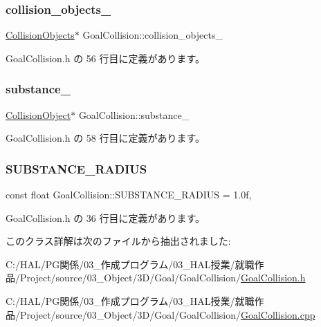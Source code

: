\subsubsection{\texorpdfstring{collision\+\_\+objects\+\_\+}{collision\_objects\_}}
{\footnotesize\ttfamily \mbox{\hyperlink{class_collision_objects}{Collision\+Objects}}$\ast$ Goal\+Collision\+::collision\+\_\+objects\+\_\+\hspace{0.3cm}{\ttfamily [private]}}



 Goal\+Collision.\+h の 56 行目に定義があります。

\mbox{\label{class_goal_collision_a8fa4a9b7ed96d453d4615641073937bb}} 
\subsubsection{\texorpdfstring{substance\+\_\+}{substance\_}}
{\footnotesize\ttfamily \mbox{\hyperlink{class_collision_object}{Collision\+Object}}$\ast$ Goal\+Collision\+::substance\+\_\+\hspace{0.3cm}{\ttfamily [private]}}



 Goal\+Collision.\+h の 58 行目に定義があります。

\mbox{\label{class_goal_collision_a6eb0dff2f8f77b38067eee8b22cce08a}} 
\subsubsection{\texorpdfstring{S\+U\+B\+S\+T\+A\+N\+C\+E\+\_\+\+R\+A\+D\+I\+US}{SUBSTANCE\_RADIUS}}
{\footnotesize\ttfamily const float Goal\+Collision\+::\+S\+U\+B\+S\+T\+A\+N\+C\+E\+\_\+\+R\+A\+D\+I\+US = 1.\+0f\hspace{0.3cm}{\ttfamily [static]}, {\ttfamily [private]}}



 Goal\+Collision.\+h の 36 行目に定義があります。



このクラス詳解は次のファイルから抽出されました\+:\begin{DoxyCompactItemize}
\item 
C\+:/\+H\+A\+L/\+P\+G関係/03\+\_\+作成プログラム/03\+\_\+\+H\+A\+L授業/就職作品/\+Project/source/03\+\_\+\+Object/3\+D/\+Goal/\+Goal\+Collision/\mbox{\hyperlink{_goal_collision_8h}{Goal\+Collision.\+h}}\item 
C\+:/\+H\+A\+L/\+P\+G関係/03\+\_\+作成プログラム/03\+\_\+\+H\+A\+L授業/就職作品/\+Project/source/03\+\_\+\+Object/3\+D/\+Goal/\+Goal\+Collision/\mbox{\hyperlink{_goal_collision_8cpp}{Goal\+Collision.\+cpp}}\end{DoxyCompactItemize}
